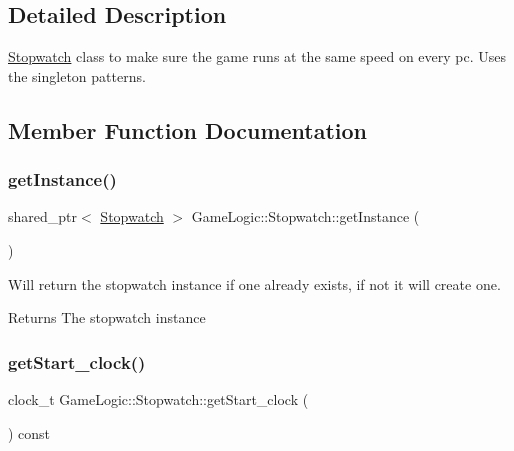 \subsection{Detailed Description}
\hyperlink{classGameLogic_1_1Stopwatch}{Stopwatch} class to make sure the game runs at the same speed on every pc. Uses the singleton patterns. 

\subsection{Member Function Documentation}
\mbox{\label{classGameLogic_1_1Stopwatch_aaca0b7d8b21eb26ed2acb4cbd63fe208}} 
\subsubsection{\texorpdfstring{get\+Instance()}{getInstance()}}
{\footnotesize\ttfamily shared\+\_\+ptr$<$ \hyperlink{classGameLogic_1_1Stopwatch}{Stopwatch} $>$ Game\+Logic\+::\+Stopwatch\+::get\+Instance (\begin{DoxyParamCaption}{ }\end{DoxyParamCaption})\hspace{0.3cm}{\ttfamily [static]}}

Will return the stopwatch instance if one already exists, if not it will create one. \begin{DoxyReturn}{Returns}
The stopwatch instance 
\end{DoxyReturn}
\mbox{\label{classGameLogic_1_1Stopwatch_a630ec6e48b90673127a033d18dd4d570}} 
\subsubsection{\texorpdfstring{get\+Start\+\_\+clock()}{getStart\_clock()}}
{\footnotesize\ttfamily clock\+\_\+t Game\+Logic\+::\+Stopwatch\+::get\+Start\+\_\+clock (\begin{DoxyParamCaption}{ }\end{DoxyParamCaption}) const}

